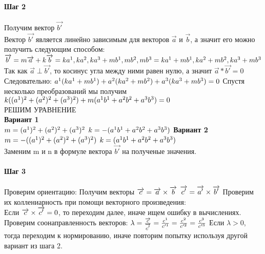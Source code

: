 \documentclass{book}
\begin{document}
\paragraph*{Шаг 2}
Получим вектор $\overrightarrow{b'}$\\
Вектор $\overrightarrow{b'}$ является линейно зависимым для векторов $\overrightarrow{a}$ и $\overrightarrow{b}$, а значит его можно получить следующим способом:\\
$\overrightarrow{b'}=m\overrightarrow{a}+k\overrightarrow{b}={ka^1,ka^2,ka^3}+{mb^1,mb^2,mb^3}={ka^1+mb^1,ka^2+mb^2,ka^3+mb^3}\\$
Так как $\overrightarrow{a}\perp\overrightarrow{b'}$, то косинус угла между ними равен нулю, а значит $\overrightarrow{a}*\overrightarrow{b'}=0$\\
Следовательно: $a^1(ka^1+mb^1)+a^2(ka^2+mb^2)+a^3(ka^3+mb^3)=0\\$
Спустя несколько преобразований мы получим $k((a^1)^2+(a^2)^2+(a^3)^2)+m(a^1b^1+a^2b^2+a^3b^3)=0\\$\\
РЕШИМ УРАВНЕНИЕ\\
\textbf{Вариант 1}\\
$m=(a^1)^2+(a^2)^2+(a^3)^2\\$
$k=-(a^1b^1+a^2b^2+a^3b^3)\\$
\textbf{Вариант 2}\\
$m=-((a^1)^2+(a^2)^2+(a^3)^2)\\$
$k=(a^1b^1+a^2b^2+a^3b^3)\\$
\\
Заменим m и n в формуле вектора $\overrightarrow{b'}$ на полученые значения.
\paragraph*{Шаг 3}
Проверим ориентацию:
Получим векторы
$\overrightarrow{c}=\overrightarrow{a}\times\overrightarrow{b}\\$
$\overrightarrow{c'}=\overrightarrow{a'}\times\overrightarrow{b'}\\$
Проверим их коллениарность при помощи векторного произведения:\\
Если $\overrightarrow{c}\times\overrightarrow{c'}=0\\$, то переходим далее, иначе ищем ошибку в вычислениях.\\
Проверим соонаправленность векторов:
$\lambda=\frac{\overrightarrow{c}}{\overrightarrow{c'}}=\frac{c^1}{c'^1}=\frac{c^2}{c'^2}=\frac{c^3}{c'^3}\\$
Если $\lambda > 0$, тогда переходим к нормированию, иначе повторим попытку используя другой вариант из шага 2.\\
\end{document}
